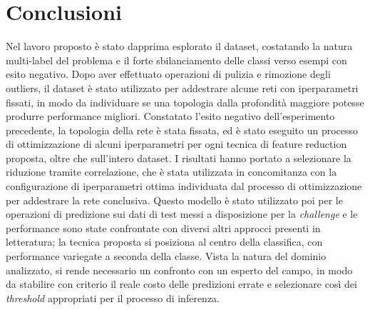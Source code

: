 \section{Conclusioni}
Nel lavoro proposto è stato dapprima esplorato il dataset, costatando la natura multi-label del problema e il forte sbilanciamento delle classi verso esempi con esito negativo. Dopo aver effettuato operazioni di pulizia e rimozione degli outliers, il dataset è stato utilizzato per addestrare alcune reti con iperparametri fissati, in modo da individuare se una topologia dalla profondità maggiore potesse produrre performance migliori. Constatato l'esito negativo dell'esperimento precedente, la topologia della rete è stata fissata, ed è stato eseguito un processo di ottimizzazione di alcuni iperparametri per ogni tecnica di feature reduction proposta, oltre che sull'intero dataset. I risultati hanno portato a selezionare la riduzione tramite correlazione, che è stata utilizzata in concomitanza con la configurazione di iperparametri ottima individuata dal processo di ottimizzazione per addestrare la rete conclusiva. Questo modello è stato utilizzato poi per le operazioni di predizione sui dati di test messi a disposizione per la \textit{challenge} e le performance sono state confrontate con diversi altri approcci presenti in letteratura; la tecnica proposta si posiziona al centro della classifica, con performance variegate a seconda della classe. Vista la natura del dominio analizzato, si rende necessario un confronto con un esperto del campo, in modo da stabilire con criterio il reale costo delle predizioni errate e selezionare così dei \textit{threshold} appropriati per il processo di inferenza.